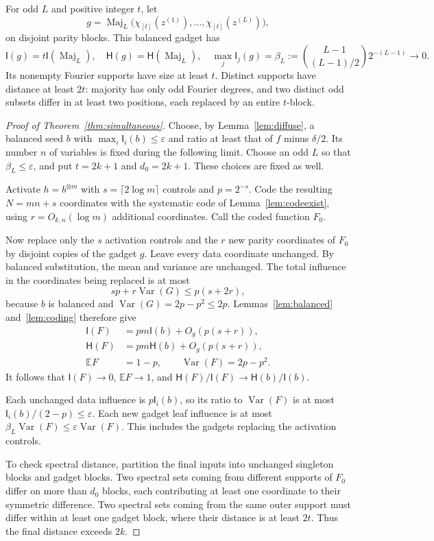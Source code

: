 \documentclass[11pt]{amsart}
\theoremstyle{definition}
\theoremstyle{remark}
\newcommand{\E}{\mathbb E}
\newcommand{\HH}{\mathsf H}
\newcommand{\I}{\mathsf I}
\newcommand{\eps}{\varepsilon}
\newcommand{\Var}{\operatorname{Var}}
\newcommand{\Maj}{\operatorname{Maj}}
\begin{document}
For odd $L$ and positive integer $t$, let
\[
 g=\Maj_L\bigl(\chi_{[t]}(z^{(1)}),\ldots,
                  \chi_{[t]}(z^{(L)})\bigr),
\]
on disjoint parity blocks. This balanced gadget has
\begin{equation}\label{eq:gadget}
 \I(g)=t\I(\Maj_L),\quad \HH(g)=\HH(\Maj_L),\quad
 \max_j\I_j(g)=\beta_L:=\binom{L-1}{(L-1)/2}2^{-(L-1)}\longrightarrow0.
\end{equation}
Its nonempty Fourier supports have size at least $t$. Distinct supports have distance at least $2t$: majority has only odd Fourier degrees, and two distinct odd subsets differ in at least two positions, each replaced by an entire $t$-block.

\begin{proof}[Proof of Theorem~\ref{thm:simultaneous}]
Choose, by Lemma~\ref{lem:diffuse}, a balanced seed $b$ with $\max_i\I_i(b)\le\eps$ and ratio at least that of $f$ minus $\delta/2$. Its number $n$ of variables is fixed during the following limit. Choose an odd $L$ so that $\beta_L\le\eps$, and put $t=2k+1$ and $d_0=2k+1$. These choices are fixed as well.

Activate $h=b^{\otimes m}$ with $s=\lceil2\log m\rceil$ controls and $p=2^{-s}$. Code the resulting $N=mn+s$ coordinates with the systematic code of Lemma~\ref{lem:codeexist}, using $r=O_{k,n}(\log m)$ additional coordinates. Call the coded function $F_0$.

Now replace only the $s$ activation controls and the $r$ new parity coordinates of $F_0$ by disjoint copies of the gadget $g$. Leave every data coordinate unchanged. By balanced substitution, the mean and variance are unchanged. The total influence in the coordinates being replaced is at most
\[
 sp+r\Var(G)\le p(s+2r),
\]
because $b$ is balanced and $\Var(G)=2p-p^2\le2p$. Lemmas~\ref{lem:balanced} and~\ref{lem:coding} therefore give
\begin{align*}
 \I(F)&=pm\I(b)+O_{g}(p(s+r)),\\
 \HH(F)&=pm\HH(b)+O_{g}(p(s+r)),\\
 \E F&=1-p,\qquad \Var(F)=2p-p^2.
\end{align*}
It follows that $\I(F)\to0$, $\E F\to1$, and $\HH(F)/\I(F)\to\HH(b)/\I(b)$.

Each unchanged data influence is $p\I_i(b)$, so its ratio to $\Var(F)$ is at most $\I_i(b)/(2-p)\le\eps$. Each new gadget leaf influence is at most $\beta_L\Var(F)\le\eps\Var(F)$. This includes the gadgets replacing the activation controls.

To check spectral distance, partition the final inputs into unchanged singleton blocks and gadget blocks. Two spectral sets coming from different supports of $F_0$ differ on more than $d_0$ blocks, each contributing at least one coordinate to their symmetric difference. Two spectral sets coming from the same outer support must differ within at least one gadget block, where their distance is at least $2t$. Thus the final distance exceeds $2k$.


\end{proof}
\end{document}
